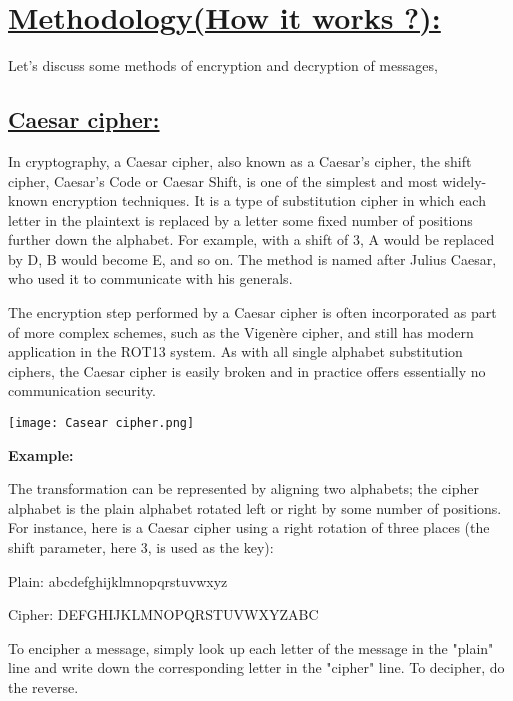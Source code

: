 \documentclass[a4paper,12pt]{article}
\begin{document}
    \pagebreak

    \section*{\underline{Methodology(How it works ?):}}

    Let's discuss some methods of encryption and decryption of messages,

    \subsection*{\underline{Caesar cipher:}}

    In cryptography, a Caesar cipher, also known as a Caesar's cipher, the shift cipher, Caesar's Code or Caesar Shift, is one of the simplest and most widely-known encryption techniques. It is a type of substitution cipher in which each letter in the plaintext is replaced by a letter some fixed number of positions further down the alphabet. For example, with a shift of 3, A would be replaced by D, B would become E, and so on. The method is named after Julius Caesar, who used it to communicate with his generals.

    The encryption step performed by a Caesar cipher is often incorporated as part of more complex schemes, such as the Vigenère cipher, and still has modern application in the ROT13 system. As with all single alphabet substitution ciphers, the Caesar cipher is easily broken and in practice offers essentially no communication security.
    \vspace*{0.5cm}

    \texttt{[image: Casear cipher.png]}

    {\bf Example:}


    The transformation can be represented by aligning two alphabets; the cipher alphabet is the plain alphabet rotated left or right by some number of positions. For instance, here is a Caesar cipher using a right rotation of three places (the shift parameter, here 3, is used as the key):
    \vspace*{0.2cm}

    Plain: abcdefghijklmnopqrstuvwxyz


    Cipher: DEFGHIJKLMNOPQRSTUVWXYZABC
    \vspace*{0.2cm}


    To encipher a message, simply look up each letter of the message in the "plain" line and write down the corresponding letter in the "cipher" line. To decipher, do the reverse.
    \vspace*{0.2cm}
\end{document}
